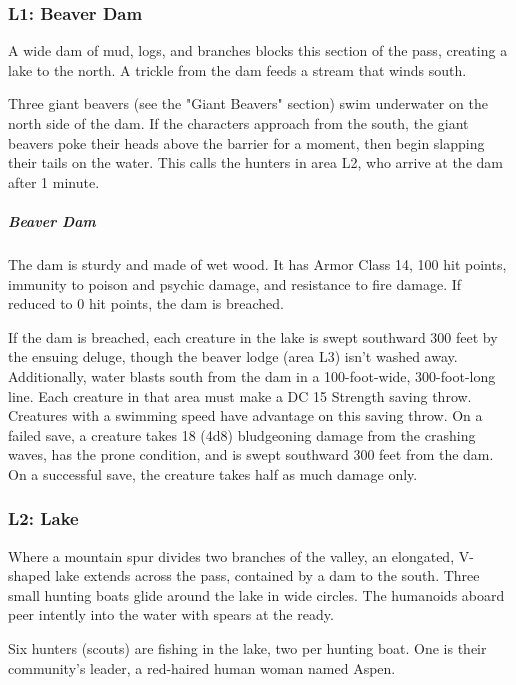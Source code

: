 \documentclass[10pt,a4paper,twoside,bg=print,twocolumn,openany,nodeprecatedcode]{dndbook}
\begin{document}
\subsubsection{L1: Beaver Dam}
\begin{DndReadAloud}{}
A wide dam of mud, logs, and branches blocks this section of the pass, creating a lake to the north. A trickle from the dam feeds a stream that winds south.

\end{DndReadAloud}

Three giant beavers (see the "Giant Beavers" section) swim underwater on the north side of the dam. If the characters approach from the south, the giant beavers poke their heads above the barrier for a moment, then begin slapping their tails on the water. This calls the hunters in area L2, who arrive at the dam after 1 minute.

\subparagraph{Beaver Dam}
The dam is sturdy and made of wet wood. It has Armor Class 14, 100 hit points, immunity to poison and psychic damage, and resistance to fire damage. If reduced to 0 hit points, the dam is breached.

If the dam is breached, each creature in the lake is swept southward 300 feet by the ensuing deluge, though the beaver lodge (area L3) isn't washed away. Additionally, water blasts south from the dam in a 100-foot-wide, 300-foot-long line. Each creature in that area must make a DC 15 Strength saving throw. Creatures with a swimming speed have advantage on this saving throw. On a failed save, a creature takes 18 (4d8) bludgeoning damage from the crashing waves, has the prone condition, and is swept southward 300 feet from the dam. On a successful save, the creature takes half as much damage only.

\subsubsection{L2: Lake}
\begin{DndReadAloud}{}
Where a mountain spur divides two branches of the valley, an elongated, V-shaped lake extends across the pass, contained by a dam to the south. Three small hunting boats glide around the lake in wide circles. The humanoids aboard peer intently into the water with spears at the ready.

\end{DndReadAloud}

Six hunters (scouts) are fishing in the lake, two per hunting boat. One is their community's leader, a red-haired human woman named Aspen.
\end{document}
